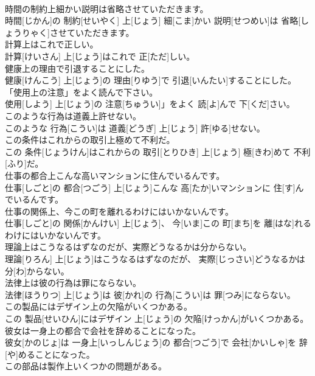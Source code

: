 \documentclass[8pt]{extreport}
\begin{document}
\begin{CJK}{UTF8}{min}
\\	時間の制約上細かい説明は省略させていただきます。	
\\	時間[じかん]の 制約[せいやく] 上[じょう] 細[こま]かい 説明[せつめい]は 省略[しょうりゃく]させていただきます。
\\	計算上はこれで正しい。	
\\	計算[けいさん] 上[じょう]はこれで 正[ただ]しい。
\\	健康上の理由で引退することにした。	
\\	健康[けんこう] 上[じょう]の 理由[りゆう]で 引退[いんたい]することにした。
\\	「使用上の注意」をよく読んで下さい。	
\\	使用[しよう] 上[じょう]の 注意[ちゅうい]」をよく 読[よ]んで 下[くだ]さい。
\\	このような行為は道義上許せない。	
\\	このような 行為[こうい]は 道義[どうぎ] 上[じょう] 許[ゆる]せない。
\\	この条件はこれからの取引上極めて不利だ。	
\\	この 条件[じょうけん]はこれからの 取引[とりひき] 上[じょう] 極[きわ]めて 不利[ふり]だ。
\\	仕事の都合上こんな高いマンションに住んでいるんです。	
\\	仕事[しごと]の 都合[つごう] 上[じょう]こんな 高[たか]いマンションに 住[す]んでいるんです。
\\	仕事の関係上、今この町を離れるわけにはいかないんです。	
\\	仕事[しごと]の 関係[かんけい] 上[じょう]、 今[いま]この 町[まち]を 離[はな]れるわけにはいかないんです。
\\	理論上はこうなるはずなのだが、実際どうなるかは分からない。	
\\	理論[りろん] 上[じょう]はこうなるはずなのだが、 実際[じっさい]どうなるかは 分[わ]からない。
\\	法律上は彼の行為は罪にならない。	
\\	法律[ほうりつ] 上[じょう]は 彼[かれ]の 行為[こうい]は 罪[つみ]にならない。
\\	この製品にはデザイン上の欠陥がいくつかある。	
\\	この 製品[せいひん]にはデザイン 上[じょう]の 欠陥[けっかん]がいくつかある。
\\	彼女は一身上の都合で会社を辞めることになった。	
\\	彼女[かのじょ]は 一身上[いっしんじょう]の 都合[つごう]で 会社[かいしゃ]を 辞[や]めることになった。
\\	この部品は製作上いくつかの問題がある。	

\end{CJK}
\end{document}
